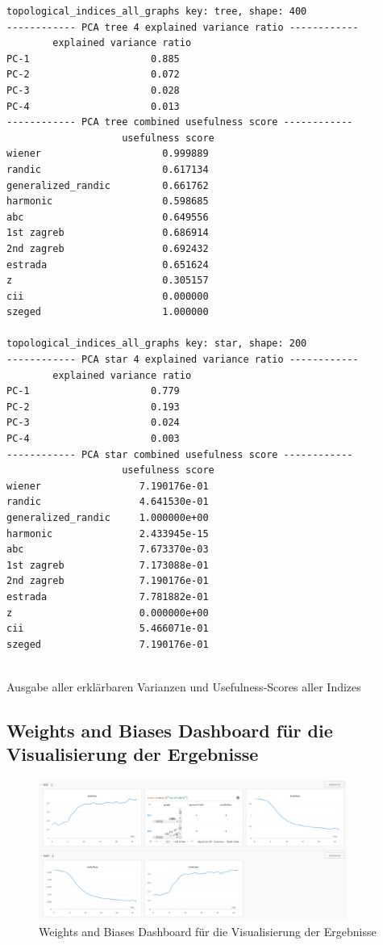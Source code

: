\begin{code}
\begin{verbatim}
topological_indices_all_graphs key: tree, shape: 400
------------ PCA tree 4 explained variance ratio ------------
        explained variance ratio
PC-1                     0.885
PC-2                     0.072
PC-3                     0.028
PC-4                     0.013
------------ PCA tree combined usefulness score ------------
                    usefulness score
wiener                     0.999889
randic                     0.617134
generalized_randic         0.661762
harmonic                   0.598685
abc                        0.649556
1st zagreb                 0.686914
2nd zagreb                 0.692432
estrada                    0.651624
z                          0.305157
cii                        0.000000
szeged                     1.000000

topological_indices_all_graphs key: star, shape: 200
------------ PCA star 4 explained variance ratio ------------
        explained variance ratio
PC-1                     0.779
PC-2                     0.193
PC-3                     0.024
PC-4                     0.003
------------ PCA star combined usefulness score ------------
                    usefulness score
wiener                 7.190176e-01
randic                 4.641530e-01
generalized_randic     1.000000e+00
harmonic               2.433945e-15
abc                    7.673370e-03
1st zagreb             7.173088e-01
2nd zagreb             7.190176e-01
estrada                7.781882e-01
z                      0.000000e+00
cii                    5.466071e-01
szeged                 7.190176e-01


    \end{verbatim}
    \caption{Ausgabe aller erklärbaren Varianzen und Usefulness-Scores aller Indizes}
\end{code}

\subsection{Weights and Biases Dashboard für die Visualisierung der Ergebnisse} \label{sec:wandb_dashboard}

\begin{figure}[ht]
    \centering
    \includegraphics[width=0.9\textwidth]{images/30_results/wandb_dashboard.png}
    \caption{Weights and Biases Dashboard für die Visualisierung der Ergebnisse}
    \label{fig:wandb_dashboard}
\end{figure}

